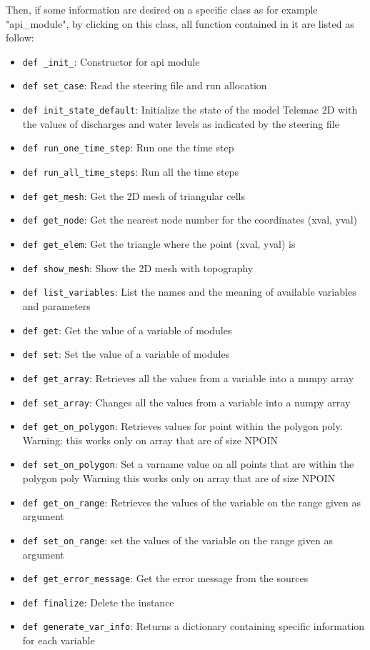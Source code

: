 Then, if some information are desired on a specific class as for example
"api\_module", by clicking on this class, all function contained in it are listed
as follow:

\begin{itemize}
\item \verb+def _init_+: Constructor for api module
\item \verb+def set_case+: Read the steering file and run allocation
\item \verb+def init_state_default+: Initialize the state of the model Telemac
  2D with the values of discharges and water levels as indicated by the steering
  file
\item \verb+def run_one_time_step+: Run one the time step
\item \verb+def run_all_time_steps+: Run all the time steps
\item \verb+def get_mesh+: Get the 2D mesh of triangular cells
\item \verb+def get_node+: Get the nearest node number for the coordinates
  (xval, yval)
\item \verb+def get_elem+: Get the triangle where the point (xval, yval) is
\item \verb+def show_mesh+: Show the 2D mesh with topography
\item \verb+def list_variables+: List the names and the meaning of available
  variables and parameters
\item \verb+def get+: Get the value of a variable of \telemacsystem modules
\item \verb+def set+: Set the value of a variable of \telemacsystem modules
\item \verb+def get_array+: Retrieves all the values from a variable into a
  numpy array
\item \verb+def set_array+: Changes all the values from a variable into a numpy
  array
\item \verb+def get_on_polygon+: Retrieves values for point within the polygon
  poly. Warning: this works only on array that are of size NPOIN
\item \verb+def set_on_polygon+: Set a varname value on all points that are
  within the polygon poly Warning this works only on array that are of size
  NPOIN
\item \verb+def get_on_range+: Retrieves the values of the variable on the
  range given as argument
\item \verb+def set_on_range+: set the values of the variable on the range
  given as argument
\item \verb+def get_error_message+: Get the error message from the \fortran
  sources
\item \verb+def finalize+: Delete the \telemacsystem instance
\item \verb+def generate_var_info+: Returns a dictionary containing specific
  information for each variable
\end{itemize}

